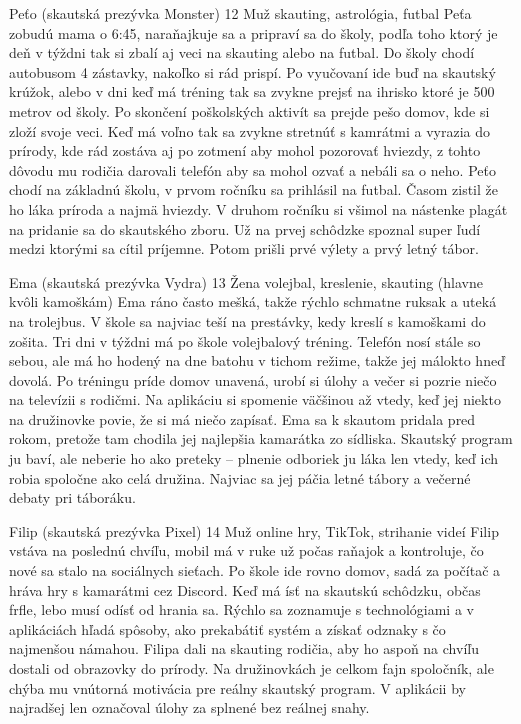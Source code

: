 {Peťo (skautská prezývka Monster)}
{12}
{Muž}
{skauting, astrológia, futbal}
{Peťa zobudú mama o 6:45, naraňajkuje sa a pripraví sa do školy, podľa toho ktorý je deň v týždni tak si zbalí aj veci na skauting alebo na futbal. Do školy chodí autobusom 4 zástavky, nakoľko si rád prispí. Po vyučovaní ide buď na skautský krúžok, alebo v dni keď má tréning tak sa zvykne prejsť na ihrisko ktoré je 500 metrov od školy. Po skončení poškolských aktivít sa prejde pešo domov, kde si zloží svoje veci. Keď má voľno tak sa zvykne stretnúť s kamrátmi a vyrazia do prírody, kde rád zostáva aj po zotmení aby mohol pozorovať hviezdy, z tohto dôvodu mu rodičia darovali telefón aby sa mohol ozvať a nebáli sa o neho.}
{Peťo chodí na základnú školu, v prvom ročníku sa prihlásil na futbal. Časom zistil že ho láka príroda a najmä hviezdy. V druhom ročníku si všimol na nástenke plagát na pridanie sa do skautského zboru. Už na prvej schôdzke spoznal super ľudí medzi ktorými sa cítil príjemne. Potom prišli prvé výlety a prvý letný tábor.}

{Ema (skautská prezývka Vydra)}
{13}
{Žena}
{volejbal, kreslenie, skauting (hlavne kvôli kamoškám)}
{Ema ráno často mešká, takže rýchlo schmatne ruksak a uteká na trolejbus. V škole sa najviac teší na prestávky, kedy kreslí s kamoškami do zošita. Tri dni v týždni má po škole volejbalový tréning. Telefón nosí stále so sebou, ale má ho hodený na dne batohu v tichom režime, takže jej málokto hneď dovolá. Po tréningu príde domov unavená, urobí si úlohy a večer si pozrie niečo na televízii s rodičmi. Na aplikáciu si spomenie väčšinou až vtedy, keď jej niekto na družinovke povie, že si má niečo zapísať.}
{Ema sa k skautom pridala pred rokom, pretože tam chodila jej najlepšia kamarátka zo sídliska. Skautský program ju baví, ale neberie ho ako preteky – plnenie odboriek ju láka len vtedy, keď ich robia spoločne ako celá družina. Najviac sa jej páčia letné tábory a večerné debaty pri táboráku.}

{Filip (skautská prezývka Pixel)}
{14}
{Muž}
{online hry, TikTok, strihanie videí}
{Filip vstáva na poslednú chvíľu, mobil má v ruke už počas raňajok a kontroluje, čo nové sa stalo na sociálnych sieťach. Po škole ide rovno domov, sadá za počítač a hráva hry s kamarátmi cez Discord. Keď má ísť na skautskú schôdzku, občas frfle, lebo musí odísť od hrania sa. Rýchlo sa zoznamuje s technológiami a v aplikáciách hľadá spôsoby, ako prekabátiť systém a získať odznaky s čo najmenšou námahou.}
{Filipa dali na skauting rodičia, aby ho aspoň na chvíľu dostali od obrazovky do prírody. Na družinovkách je celkom fajn spoločník, ale chýba mu vnútorná motivácia pre reálny skautský program. V aplikácii by najradšej len označoval úlohy za splnené bez reálnej snahy.}

